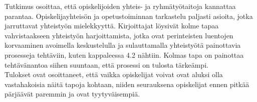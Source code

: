 \documentclass[finnish]{article}
\begin{document}
Tutkimus osoittaa, että opiskelijoiden yhteis- ja ryhmätyötaitoja kannattaa parantaa. Opiskelijayhteisön ja opetustoiminnan tarkastelu paljasti asioita, jotka jarruttavat yhteistyön mielekkyyttä. Kirjoittajat löysivät kolme tapaa vahvistaakseen yhteistyön harjoittamista, jotka ovat perinteisten luentojen korvaaminen avoimella keskustelulla ja sulauttamalla yhteistyötä painottavia prosesseja tehtäviin, kuten kappaleessa 4.2 nähtiin. Kolmas tapa on painottaa tehtävänantoa siihen suuntaan, että prosessi on tulosta tärkeämpi.\\

Tulokset ovat osoittaneet, että vaikka opiskelijat voivat ovat aluksi olla vastahakoisia näitä tapoja kohtaan, niiden seurauksena opiskelijat ennen pitkää pärjäävät paremmin ja ovat tyytyväisempiä.



\end{document}
